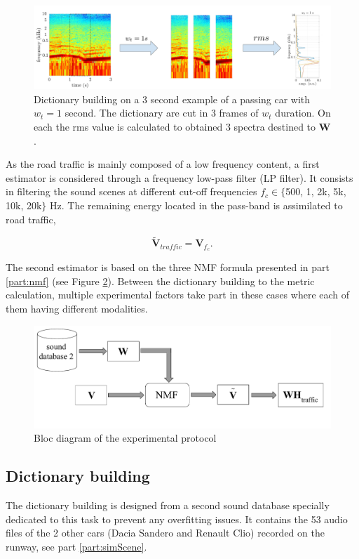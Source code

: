 \documentclass[review,5p,twocolumn,sort&compress,times]{elsarticle}
\begin{document}
\begin{figure}[t]
\centering
\includegraphics[width=0.8\linewidth]{figures/extractionDictionary2.pdf}
\caption{Dictionary building on a 3 second example of a passing car with $w_t = 1$ second. The dictionary are cut in 3 frames of $w_t$ duration. On each the rms value is calculated to obtained 3 spectra destined to $\mathbf{W}$.}
\label{fig:example_dictionary}
\end{figure}

As the road traffic is mainly composed of a low frequency content, a first estimator is considered through a frequency low-pass filter (LP filter). It consists in filtering the sound scenes at different cut-off frequencies $f_c \in \lbrace$500, 1, 2k, 5k, 10k, 20k$\rbrace$ Hz. The remaining energy located in the pass-band is assimilated to road traffic, 

\begin{equation}
\mathbf{\tilde{V}}_{traffic} = \mathbf{V}_{f_c}.
\end{equation}

The second estimator is based on the three NMF formula presented in part \ref{part:nmf} (see Figure \ref{fig:bloc_diagram_nmf}). Between the dictionary building to the metric calculation, multiple experimental factors take part in these cases where each of them having different modalities.

\begin{figure}[t]
\centering
\includegraphics[width=.9\linewidth]{figures/bloc_diagram_NMF_EN_2.pdf}
\caption{Bloc diagram of the experimental protocol}
\label{fig:bloc_diagram_nmf}
\end{figure}

\subsection{Dictionary building}\label{part:dictionary_building}
The dictionary building is designed from a second sound database specially dedicated to this task to prevent any overfitting issues. It contains the 53 audio files of the 2 other cars (Dacia Sandero and Renault Clio) recorded on the runway, see part \ref{part:simScene}. 
\end{document}
